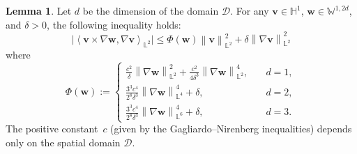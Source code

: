 \documentclass[11pt,reqno]{amsart}
\theoremstyle{definition}
\newtheorem{lemma}[theorem]{Lemma}
\numberwithin{equation}{section}
\newcommand{\bff}{\boldsymbol}
\newcommand{\bb}{\mathbb}
\newcommand{\norm}[2]{\left\|{#1}\right\|_{#2}}
\newcommand{\inpro}[2]{\left\langle#1,#2\right\rangle}
\begin{document}
\begin{lemma}\label{lem:tec lem}
	Let $d$ be the dimension of the domain $\mathscr{D}$. For any $\bff{v}\in \bb{H}^1$, $\bff{w}\in \bb{W}^{1,2d}$, and $\delta>0$, the
	following inequality holds:
	\[
	\Big|
	\inpro{\bff{v}\times\nabla\bff{w}}{\nabla\bff{v}}_{\bb{L}^2}
	\Big|
	\le
	\Phi(\bff{w})
	\norm{\bff{v}}{\bb{L}^2}^2
	+
	\delta \norm{\nabla\bff{v}}{\bb{L}^2}^2
	\]
	where
	\begin{equation}\label{equ:Phi}
		\Phi(\bff{w})
		:=
		\begin{cases}
			\frac{c^2}{\delta}
			\norm{\nabla\bff{w}}{\bb{L}^2}^2
			+
			\frac{c^2}{4\delta^3}
			\norm{\nabla\bff{w}}{\bb{L}^2}^4,
			\quad & d=1,
			\\[1ex]
			\frac{3^3 c^4}{2^8\delta^3}
			\norm{\nabla\bff{w}}{\bb{L}^4}^4 
			+ \delta,
			\quad & d=2,
			\\[1ex]
			\frac{3^3 c^4}{2^8\delta^3}
			\norm{\nabla\bff{w}}{\bb{L}^6}^4 
			+ \delta,
			\quad & d=3.
		\end{cases}
	\end{equation}
	The positive constant~$c$ (given by the Gagliardo--Nirenberg inequalities) depends
	only on the spatial domain $\mathscr{D}$.
\end{lemma}
\end{document}
